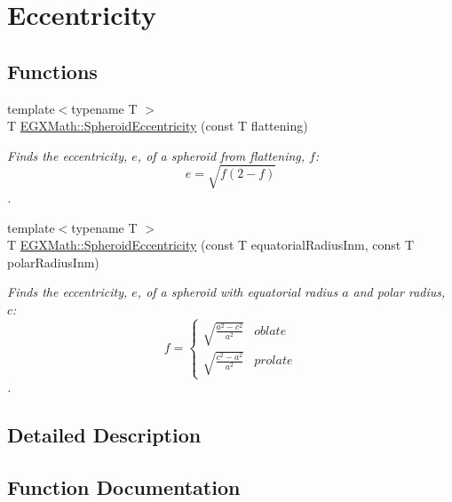 \hypertarget{group___e_g_x_math-_geometry-3_d-_spheroid-_eccentricity}{}\section{Eccentricity}
\label{group___e_g_x_math-_geometry-3_d-_spheroid-_eccentricity}
\subsection*{Functions}
\begin{DoxyCompactItemize}
\item 
{\footnotesize template$<$typename T $>$ }\\T \mbox{\hyperlink{group___e_g_x_math-_geometry-3_d-_spheroid-_eccentricity_gab45680528a41bb7a5e15ddc0059156dd}{E\+G\+X\+Math\+::\+Spheroid\+Eccentricity}} (const T flattening)
\begin{DoxyCompactList}\small\item\em Finds the eccentricity, $e$, of a spheroid from flattening, $f$\+: \[ e = \sqrt{f (2 - f)} \]. \end{DoxyCompactList}\item 
{\footnotesize template$<$typename T $>$ }\\T \mbox{\hyperlink{group___e_g_x_math-_geometry-3_d-_spheroid-_eccentricity_ga0b6ce84e9c4c2fd5bc5a29569c2c2295}{E\+G\+X\+Math\+::\+Spheroid\+Eccentricity}} (const T equatorial\+Radius\+Inm, const T polar\+Radius\+Inm)
\begin{DoxyCompactList}\small\item\em Finds the eccentricity, $e$, of a spheroid with equatorial radius $a$ and polar radius, $c$\+: \[ f =\begin{cases} \sqrt{\frac{a^2-c^2}{a^2}} & oblate \\ \sqrt{\frac{c^2-a^2}{a^2}} & prolate \end{cases} \]. \end{DoxyCompactList}\end{DoxyCompactItemize}


\subsection{Detailed Description}


\subsection{Function Documentation}
\mbox{\label{group___e_g_x_math-_geometry-3_d-_spheroid-_eccentricity_gab45680528a41bb7a5e15ddc0059156dd}} 
